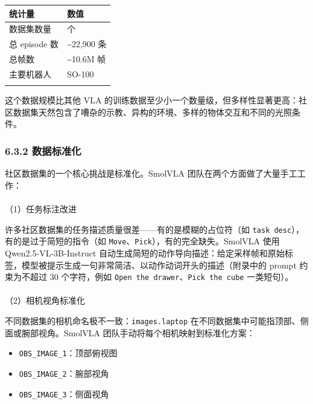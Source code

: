 \documentclass[
  chinese,
]{ctexart}
\makeatletter
\let\oldparagraph\paragraph
\renewcommand{\paragraph}{
    \@ifstar
      \xxxParagraphStar
      \xxxParagraphNoStar
  }
\newcommand{\xxxParagraphStar}[1]{\oldparagraph*{#1}\mbox{}}
\newcommand{\xxxParagraphNoStar}[1]{\oldparagraph{#1}\mbox{}}
\providecommand{\tightlist}{%
  \setlength{\itemsep}{0pt}\setlength{\parskip}{0pt}}
\makeatother
\begin{document}
\begin{center}
\begin{tabular}{@{}>{\raggedright\arraybackslash}p{} >{\raggedright\arraybackslash}p{}@{}}
\toprule\noalign{}
统计量 & 数值 \\
\midrule\noalign{}
数据集数量 & 481 个 \\
总 episode 数 & \textasciitilde22,900 条 \\
总帧数 & \textasciitilde10.6M 帧 \\
主要机器人 & SO-100 \\
\bottomrule\noalign{}
\end{tabular}
\end{center}

这个数据规模比其他 VLA
的训练数据至少小一个数量级，但多样性显著更高：社区数据集天然包含了嘈杂的示教、异构的环境、多样的物体交互和不同的光照条件。

\subsubsection{6.3.2 数据标准化}\label{ux6570ux636eux6807ux51c6ux5316}

社区数据集的一个核心挑战是标准化。SmolVLA
团队在两个方面做了大量手工工作：

\paragraph{（1）任务标注改进}\label{ux4efbux52a1ux6807ux6ce8ux6539ux8fdb}

许多社区数据集的任务描述质量很差------有的是模糊的占位符（如
\texttt{task\ desc}），有的是过于简短的指令（如
\texttt{Move}、\texttt{Pick}），有的完全缺失。SmolVLA 使用
Qwen2.5-VL-3B-Instruct
自动生成简短的动作导向描述：给定采样帧和原始标签，模型被提示生成一句非常简洁、以动作动词开头的描述（附录中的
prompt 约束为不超过 30 个字符，例如
\texttt{Open\ the\ drawer}、\texttt{Pick\ the\ cube} 一类短句）。

\paragraph{（2）相机视角标准化}\label{ux76f8ux673aux89c6ux89d2ux6807ux51c6ux5316}

不同数据集的相机命名极不一致：\texttt{images.laptop}
在不同数据集中可能指顶部、侧面或腕部视角。SmolVLA
团队手动将每个相机映射到标准化方案：

\begin{itemize}
\tightlist
\item
  \texttt{OBS\_IMAGE\_1}：顶部俯视图
\item
  \texttt{OBS\_IMAGE\_2}：腕部视角
\item
  \texttt{OBS\_IMAGE\_3}：侧面视角
\end{itemize}
\end{document}
